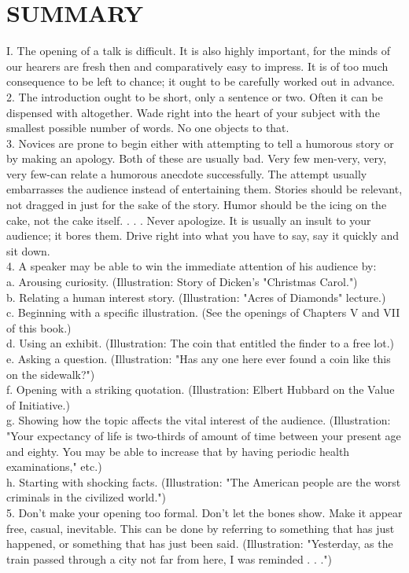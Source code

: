 \documentclass[10pt]{article}
\begin{document}
\section*{SUMMARY}
I. The opening of a talk is difficult. It is also highly important, for the minds of our hearers are fresh then and comparatively easy to impress. It is of too much consequence to be left to chance; it ought to be carefully worked out in advance.\\
2. The introduction ought to be short, only a sentence or two. Often it can be dispensed with altogether. Wade right into the heart of your subject with the smallest possible number of words. No one objects to that.\\
3. Novices are prone to begin either with attempting to tell a humorous story or by making an apology. Both of these are usually bad. Very few men-very, very, very few-can relate a humorous anecdote successfully. The attempt usually embarrasses the audience instead of entertaining them. Stories should be relevant, not dragged in just for the sake of the story. Humor should be the icing on the cake, not the cake itself. . . . Never apologize. It is usually an insult to your audience; it bores them. Drive right into what you have to say, say it quickly and sit down.\\
4. A speaker may be able to win the immediate attention of his audience by:\\
a. Arousing curiosity. (Illustration: Story of Dicken's "Christmas Carol.")\\
b. Relating a human interest story. (Illustration: "Acres of Diamonds" lecture.)\\
c. Beginning with a specific illustration. (See the openings of Chapters V and VII of this book.)\\
d. Using an exhibit. (Illustration: The coin that entitled the finder to a free lot.)\\
e. Asking a question. (Illustration: "Has any one here ever found a coin like this on the sidewalk?")\\
f. Opening with a striking quotation. (Illustration: Elbert Hubbard on the Value of Initiative.)\\
g. Showing how the topic affects the vital interest of the audience. (Illustration: "Your expectancy of life is two-thirds of amount of time between your present age and eighty. You may be able to increase that by having periodic health examinations," etc.)\\
h. Starting with shocking facts. (Illustration: "The American people are the worst criminals in the civilized world.")\\
5. Don't make your opening too formal. Don't let the bones show. Make it appear free, casual, inevitable. This can be done by referring to something that has just happened, or something that has just been said. (Illustration: "Yesterday, as the train passed through a city not far from here, I was reminded . . .")
\end{document}
